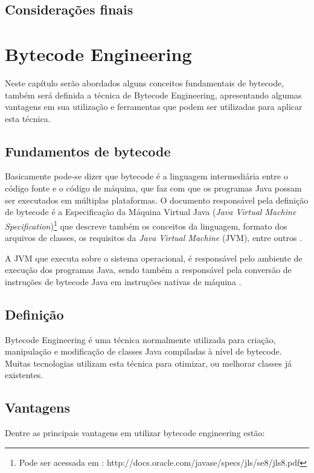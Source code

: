 \documentclass[tc,openright]{iiufrgs}
\begin{document}
\section{Considerações finais}

\chapter{Bytecode Engineering}
Neste capítulo serão abordados alguns conceitos fundamentais de bytecode, também será definida a técnica de Bytecode Engineering, apresentando algumas vantagens em sua utilização e ferramentas que podem ser utilizadas para aplicar esta técnica. 

\section{Fundamentos de bytecode}

Basicamente pode-se dizer que bytecode é a linguagem intermediária entre o código fonte e o código de máquina, que faz com que os programas Java possam ser executados em múltiplas plataformas. O documento responsável pela definição de bytecode é a Especificação da Máquina Virtual Java (\textit{Java Virtual Machine Specification})\footnote{Pode ser acessada em : http://docs.oracle.com/javase/specs/jls/se8/jls8.pdf} que descreve também os conceitos da linguagem, formato dos arquivos de classes, os requisitos da \textit{Java Virtual Machine} (JVM), entre outros \cite{kalinovsky2004covert}.

A JVM que executa sobre o sistema operacional, é responsável pelo ambiente de execução dos programas Java, sendo também a responsável pela conversão de instruções de bytecode Java em instruções nativas de máquina \cite{stark2001java}.

\section{Definição}
Bytecode Engineering é uma técnica normalmente utilizada para criação, manipulação e modificação de classes Java compiladas à nível de bytecode. Muitas tecnologias  utilizam esta técnica para otimizar, ou melhorar classes já existentes.
\section {Vantagens}

Dentre as principais vantagens em utilizar bytecode engineering estão:
\end{document}
